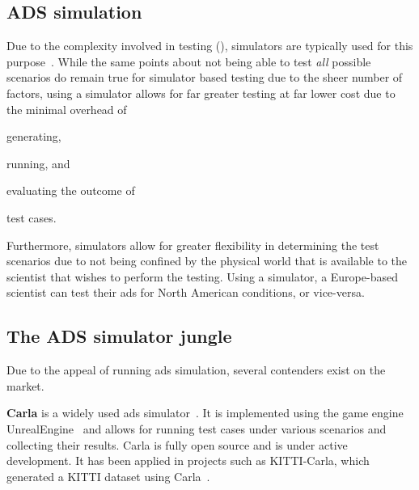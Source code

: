 
\subsection{ADS simulation}

Due to the complexity involved in testing  (),
simulators are typically used for this purpose~\cite{DeepScenario}. While the same points about not
being able to test \textit{all} possible scenarios do remain true for simulator based testing due to
the sheer number of factors, using a simulator allows for far greater testing at far lower cost due
to the minimal overhead of
\begin{inparaenum}
    \item generating,
    \item running, and
    \item evaluating the outcome of
\end{inparaenum}
test cases.

Furthermore, simulators allow for greater flexibility in determining the test scenarios due to not
being confined by the  physical world that is available to the scientist that wishes to perform the
testing. Using a simulator, a Europe-based scientist can test their \acrshort{ads} for North
American conditions, or vice-versa.

\subsection{The ADS simulator jungle}\label{sec:simulatorOverview}

Due to the appeal of running \acrshort{ads} simulation, several contenders exist
on the market.

\textbf{Carla} is a widely used \acrshort{ads} simulator~\cite{Carla}. It is implemented
using the game engine UnrealEngine~\cite{unrealengine} and allows for running
test cases under various scenarios and collecting their results. Carla is fully
open source and is under active development. It has been applied in projects such as KITTI-Carla,
which generated a KITTI dataset using Carla~\cite{kittiCarla}.

